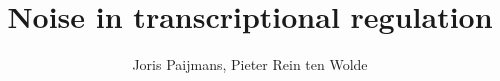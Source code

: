 \documentclass[a4paper,10pt]{article}
\begin{document}
\title{Noise in transcriptional regulation}

\author{Joris Paijmans, Pieter Rein ten Wolde \\ \\ \AMOLF}



%
%
%

%

\clearpage
\newpage
\appendix
{}
%
%


\clearpage
\newpage


\end{document}
